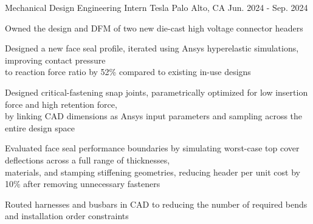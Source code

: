 

\begin{cventries}
\cventry
{Mechanical Design Engineering Intern} %
{Tesla} %
{Palo Alto, CA} %
{Jun. 2024 - Sep. 2024} %
{ %
\begin{cvitems}
\item{Owned the design and DFM of two new die-cast high voltage connector headers}
\item{Designed a new face seal profile, iterated using Ansys hyperelastic simulations, improving  contact  pressure \\ to reaction force ratio by 52\% compared to existing in-use designs}
\item{Designed critical-fastening snap joints, parametrically optimized for low insertion force and high retention force, \\
by linking CAD dimensions as Ansys input parameters and sampling across the entire design space}
\item{Evaluated face seal performance boundaries by simulating worst-case top cover deflections across a full range of  thicknesses, \\ materials, and stamping stiffening geometries, reducing header per unit cost by 10\% after removing unnecessary fasteners}
\item{Routed harnesses and busbars in CAD to reducing the number of required bends and installation order constraints}
\end{cvitems}
}


\end{cventries}
